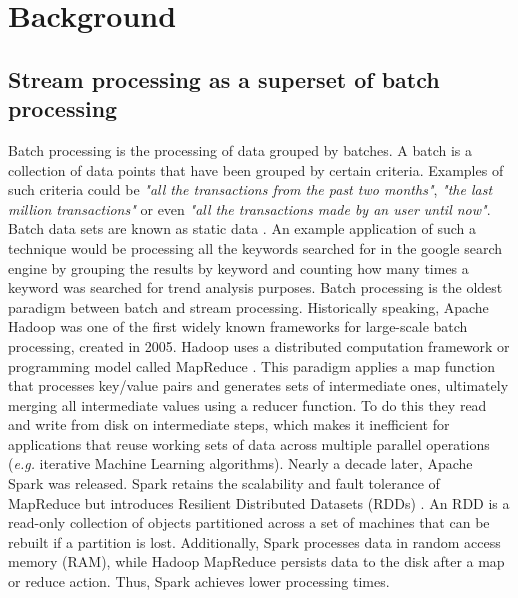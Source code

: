 \chapter{Background}\label{chap:background} \minitoc

\section{Stream processing as a superset of batch processing} \label{sec:stream-superset}

Batch processing is the processing of data grouped by batches. A batch is a collection of data points that have been grouped by certain criteria. Examples of such criteria could be \textit{"all the transactions from the past two months"}, \textit{"the last million transactions"} or even \textit{"all the transactions made by an user until now"}. Batch data sets are known as static data \cite{Martin-Batch-Defin}. An example application of such a technique would be processing all the keywords searched for in the google search engine by grouping the results by keyword and counting how many times a keyword was searched for trend analysis purposes. Batch processing is the oldest paradigm between batch and stream processing. Historically speaking, Apache Hadoop \cite{borthakur2007hadoop} \cite{Hadoop} \cite{ApacheHadoop} was one of the first widely known frameworks for large-scale batch processing, created in 2005. Hadoop uses a distributed computation framework or programming model called MapReduce \cite{MapReduce}. This paradigm applies a map function that processes key/value pairs and generates sets of intermediate ones, ultimately merging all intermediate values
using a reducer function. To do this they read and write from disk on intermediate steps, which makes it inefficient for applications that reuse working sets of data across multiple parallel operations (\textit{e.g.} iterative Machine Learning algorithms). Nearly a decade later, Apache Spark \cite{ApacheSpark} \cite{Spark} was released.
Spark retains the scalability and fault tolerance of MapReduce but introduces Resilient Distributed Datasets (RDDs) \cite{SparkRDDs}. An RDD is a read-only collection of objects partitioned across a set of machines that can be rebuilt if a partition is lost.
Additionally, Spark processes data in random access memory (RAM), while Hadoop MapReduce persists data to the disk after a map or reduce action. Thus, Spark achieves lower processing times. 

